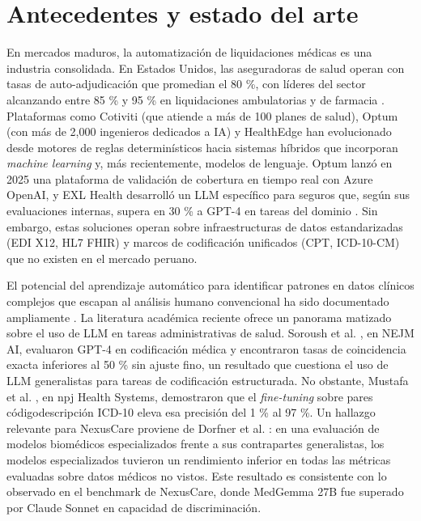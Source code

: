 \section{Antecedentes y estado del arte}

En mercados maduros, la automatización de liquidaciones médicas es una industria consolidada. En Estados Unidos, las aseguradoras de salud operan con tasas de auto-adjudicación que promedian el 80 \%, con líderes del sector alcanzando entre 85 \% y 95 \% en liquidaciones ambulatorias y de farmacia \cite{hcim2024autoadjudication}. Plataformas como Cotiviti (que atiende a más de 100 planes de salud), Optum (con más de 2,000 ingenieros dedicados a IA) y HealthEdge han evolucionado desde motores de reglas determinísticos hacia sistemas híbridos que incorporan \textit{machine learning} y, más recientemente, modelos de lenguaje. Optum lanzó en 2025 una plataforma de validación de cobertura en tiempo real con Azure OpenAI, y EXL Health desarrolló un LLM específico para seguros que, según sus evaluaciones internas, supera en 30 \% a GPT-4 en tareas del dominio \cite{exl2024insurance}. Sin embargo, estas soluciones operan sobre infraestructuras de datos estandarizadas (EDI X12, HL7 FHIR) y marcos de codificación unificados (CPT, ICD-10-CM) que no existen en el mercado peruano.

El potencial del aprendizaje automático para identificar patrones en datos clínicos complejos que escapan al análisis humano convencional ha sido documentado ampliamente  \cite{obermeyer2016future}. La literatura académica reciente ofrece un panorama matizado sobre el uso de LLM en tareas administrativas de salud. Soroush et al. \cite{soroush2024coders}, en NEJM AI, evaluaron GPT-4 en codificación médica y encontraron tasas de coincidencia exacta inferiores al 50 \% sin ajuste fino, un resultado que cuestiona el uso de LLM generalistas para tareas de codificación estructurada. No obstante, Mustafa et al. \cite{mustafa2025coding}, en npj Health Systems, demostraron que el \textit{fine-tuning} sobre pares códigodescripción ICD-10 eleva esa precisión del 1 \% al 97 \%. Un hallazgo relevante para NexusCare proviene de Dorfner et al. \cite{dorfner2024biomedical}: en una evaluación de modelos biomédicos especializados frente a sus contrapartes generalistas, los modelos especializados tuvieron un rendimiento inferior en todas las métricas evaluadas sobre datos médicos no vistos. Este resultado es consistente con lo observado en el benchmark de NexusCare, donde MedGemma 27B fue superado por Claude Sonnet en capacidad de discriminación.

